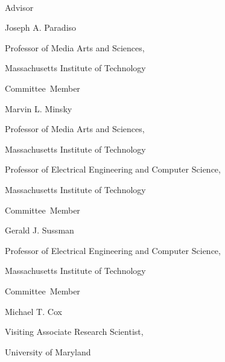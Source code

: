 \thispagestyle{empty}
\begin{center}
    \spacedlowsmallcaps{\myName} \\ \medskip                        

    \begingroup
        \color{Maroon}\spacedallcaps{\myTitle}
    \endgroup
\end{center}        

\begin{flushright}
           Advisor\hspace{0.5cm}~\makebox[2.75in]{\hrulefill}

                                 Joseph A. Paradiso

                                 Professor of Media Arts and Sciences,
                                 
                                 Massachusetts Institute of Technology
                                 
  \vspace{5mm}
  
  Committee~Member\hspace{0.5cm}~\makebox[2.75in]{\hrulefill}
  
                                 Marvin L. Minsky

                                 Professor of Media Arts and Sciences,

                                 Massachusetts Institute of Technology

                                 Professor of Electrical Engineering and Computer Science,
                                 
                                 Massachusetts Institute of Technology
                                 
  Committee~Member\hspace{0.5cm}~\makebox[2.75in]{\hrulefill}
  
                                 Gerald J. Sussman

                                 Professor of Electrical Engineering and Computer Science,
                                 
                                 Massachusetts Institute of Technology

  Committee~Member\hspace{0.5cm}~\makebox[2.75in]{\hrulefill}

                                 Michael T. Cox

                                 Visiting Associate Research Scientist,
                                 
                                 University of Maryland

\end{flushright}



